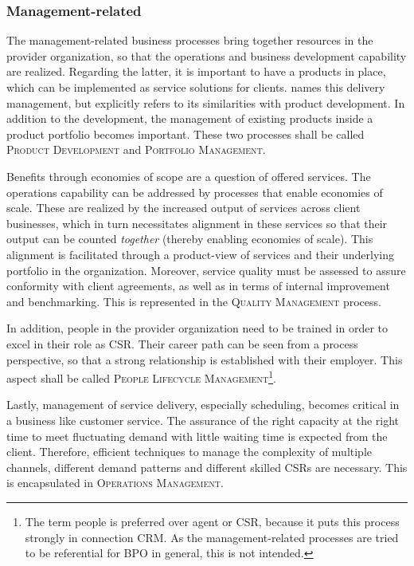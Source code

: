 	\subsubsection{Management-related}
	The management-related business processes bring together resources in the provider organization, so that the operations and business development capability are realized. Regarding the latter, it is important to have a products in place, which can be implemented as service solutions for clients. \cite{schewe2007} names this delivery management, but explicitly refers to its similarities with product development. In addition to the development, the management of existing products inside a product portfolio becomes important. These two processes shall be called \textsc{Product Development} and \textsc{Portfolio Management}.
	
	Benefits through economies of scope are a question of offered services. The operations capability can be addressed by processes that enable economies of scale. These are realized by the increased output of services across client businesses, which in turn necessitates alignment in these services so that their output can be counted \textit{together} (\eg thereby enabling economies of scale). This alignment is facilitated through a product-view of services and their underlying portfolio in the organization. Moreover, service quality must be assessed to assure conformity with client agreements, as well as in terms of internal improvement and benchmarking. This is represented in the \textsc{Quality Management} process. 
	
	In addition, people in the provider organization need to be trained in order to excel in their role as \acrshort{CSR}. Their career path can be seen from a process perspective, so that a strong relationship is established with their employer. This aspect shall be called \textsc{People Lifecycle Management}\footnote{The term people is preferred over agent or \acrshort{CSR}, because it puts this process strongly in connection \acrshort{CRM}. As the management-related processes are tried to be referential for \acrshort{BPO} in general, this is not intended.}. 
	
	Lastly, management of service delivery, especially scheduling, becomes critical in a business like customer service. The assurance of the right capacity at the right time to meet fluctuating demand with little waiting time is expected from the client. Therefore, efficient techniques to manage the complexity of multiple channels, different demand patterns and different skilled \acrshort{CSR}s are necessary. This is encapsulated in  \textsc{Operations Management}. 
	
